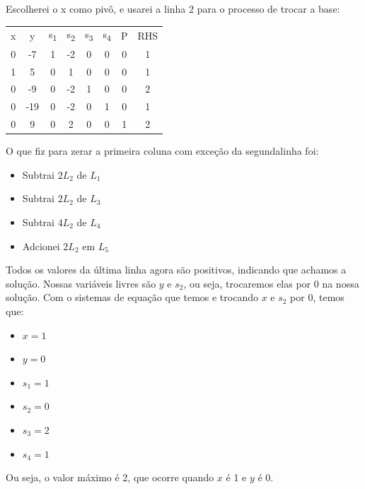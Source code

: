\documentclass[11pt]{article}
\begin{document}
Escolherei o x como pivô, e usarei a linha 2 para o processo de trocar a base:

\begin{center}
\begin{tabular}{c c c c c c c | c}
x & y & s\textsubscript{1} & s\textsubscript{2} & s\textsubscript{3} & s\textsubscript{4} & P & RHS\\
0 & -7 & 1 & -2 & 0 & 0 & 0 & 1\\
1 & 5 & 0 & 1 & 0 & 0 & 0 & 1\\
0 & -9 & 0 & -2 & 1 & 0 & 0 & 2\\
0 & -19 & 0 & -2 & 0 & 1 & 0 & 1\\
\hline
0 & 9 & 0 & 2 & 0 & 0 & 1 & 2\\
\end{tabular}
\end{center}

O que fiz para zerar a primeira coluna com exceção da segundalinha foi:

\begin{itemize}
\item Subtrai \(2L_2\) de \(L_1\)
\item Subtrai \(2L_2\) de \(L_3\)
\item Subtrai \(4L_2\) de \(L_4\)
\item Adcionei \(2L_2\) em \(L_5\)
\end{itemize}

Todos os valores da última linha agora são positivos, indicando que achamos a solução. Nossas variáveis livres são
\(y\) e \(s_2\), ou seja, trocaremos elas por 0 na nossa solução. Com o sistemas de equação que temos e trocando \(x\) e
\(s_2\) por 0, temos que:

\begin{itemize}
\item \(x=1\)
\item \(y=0\)
\item \(s_1=1\)
\item \(s_2=0\)
\item \(s_3=2\)
\item \(s_4=1\)
\end{itemize}

Ou seja, o valor máximo é 2, que ocorre quando \(x\) é 1 e \(y\) é 0.
\end{document}
